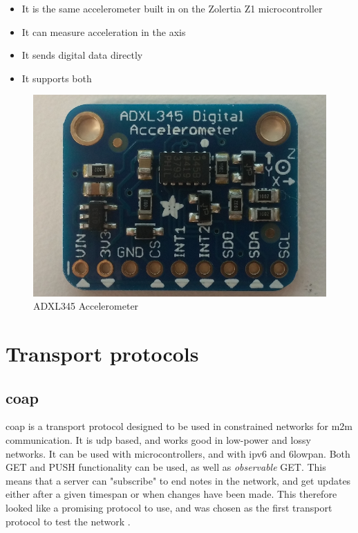 \begin{itemize}
  \item It is the same accelerometer built in on the Zolertia Z1 microcontroller
  \item It can measure acceleration in the axis
  \item It sends digital data directly
  \item It supports both %
\end{itemize}


\begin{figure}[h]
    \centering
    \includegraphics[scale=0.32]{ADXL345.png}    \caption{ADXL345 Accelerometer}
    \label{fig:adxl345}
\end{figure}

\newpage

\section{Transport protocols}

\subsection{\gls{coap}}


\gls{coap} is a transport protocol designed to be used in constrained networks for \gls{m2m} communication. It is \gls{udp} based, and works good in low-power and lossy networks. It can be used with microcontrollers, and with \gls{ipv6} and \gls{6lowpan}. Both GET and PUSH functionality can be used, as well as \textit{observable} GET. This means that a server can "subscribe" to end notes in the network, and get updates either after a given timespan or when changes have been made. This therefore looked like a promising protocol to use, and was chosen as the first transport protocol to test the network \cite{shelby2014constrained}.
   

